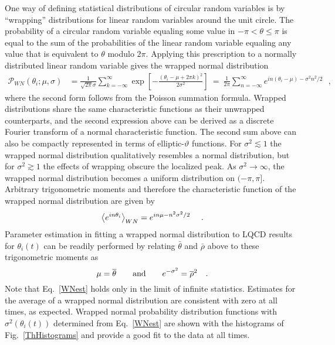 One way of defining statistical distributions of circular random variables is by ``wrapping'' distributions for linear random 
variables around the unit circle. The probability of a circular random variable equaling some value in $-\pi < \theta \leq \pi$ 
is equal to the sum of the probabilities of the linear random variable equaling any value that is equivalent to $\theta$ modulo $2\pi$. 
Applying this prescription to a normally distributed linear random variable gives the wrapped normal distribution
%
\begin{equation}
  \begin{split}
  \mathcal{P}_{WN}(\theta_i;\mu,\sigma) &= 
  \frac{1}{\sqrt{2\pi}\sigma}\sum_{k=-\infty}^\infty \exp\left[ -\frac{(\theta_i - \mu + 2\pi k)^2}{2\sigma^2} \right]
  \ =\  \frac{1}{2\pi}\sum_{n=-\infty}^\infty e^{in(\theta_i - \mu) -\sigma^2 n^2/2}
  \ \ \  ,
  \label{WNdef}
\end{split}
\end{equation}
%
where the second form follows from the Poisson summation formula. 
Wrapped distributions share the same characteristic functions as their unwrapped counterparts, 
and the second expression above can be derived as a discrete Fourier transform of a normal characteristic function. 
The second sum above can also be compactly represented in terms of elliptic-$\vartheta$ functions. 
For $\sigma^2 \lesssim 1$ the wrapped normal distribution qualitatively resembles a normal distribution, 
but for $\sigma^2 \gtrsim 1$ the effects of wrapping obscure the localized peak. 
As $\sigma^2 \rightarrow \infty$, the wrapped normal distribution becomes a uniform distribution on $(-\pi,\pi]$. 
Arbitrary trigonometric moments and therefore the characteristic function of the wrapped normal distribution are given by 
%
\begin{equation}
   \avg{e^{i n \theta_i}}_{WN} = e^{in\mu - n^2\sigma^2/2}
   \ \ \ \  .
  \label{WNmoments}
\end{equation}
%
Parameter estimation in fitting a wrapped normal distribution to LQCD results for $\theta_i(t)$ 
can be readily performed by relating $\bar{\theta}$ and $\bar{\rho}$ above to these trigonometric moments as
%
\begin{equation}
  \mu = \bar{\theta}
  \qquad {\rm and }\qquad
 e^{-\sigma^2} = \bar{\rho}^2
 \ \ \  .
  \label{WNest}
\end{equation}
%
Note that Eq.~\eqref{WNest} holds only in the limit of infinite statistics. 
Estimates for the average of a wrapped normal distribution 
are consistent with zero at all times, as expected. 
Wrapped normal probability distribution functions with $\sigma^2(\theta_i(t))$ determined from Eq.~\eqref{WNest} 
are shown with the histograms of Fig.~\ref{ThHistograms} and provide a good fit to the data at all times.



